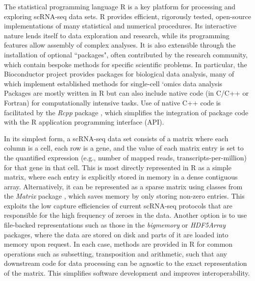 \documentclass[10pt,letterpaper]{article}
\begin{document}
The statistical programming language R \cite{R} is a key platform for processing and exploring scRNA-seq data sets.
R provides efficient, rigorously tested, open-source implementations of many statistical and numerical procedures.
Its interactive nature lends itself to data exploration and research, while its programming features allow assembly of complex analyses.
It is also extensible through the installation of optional ``packages", often contributed by the research community, which contain bespoke methods for specific scientific problems.
In particular, the Bioconductor project \cite{gentleman2004bioconductor,huber2015orchestrating} provides packages for biological data analysis, many of which implement established methods for single-cell `omics data analysis \cite{trapnell2014dynamics,lun2016pooling,mccarthy2017scater,finak2015mast}
Packages are mostly written in R but can also include native code (in C/C++ or Fortran) for computationally intensive tasks.
Use of native C++ code is facilitated by the \textit{Rcpp} package \cite{eddelbuettel2011seamless}, which simplifies the integration of package code with the R application programming interface (API).

In its simplest form, a scRNA-seq data set consists of a matrix where each column is a cell, each row is a gene, and the value of each matrix entry is set to the quantified expression (e.g., number of mapped reads, transcripts-per-million) for that gene in that cell.
This is most directly represented in R as a simple matrix, where each entry is explicitly stored in memory in a dense contiguous array.
Alternatively, it can be represented as a sparse matrix using classes from the \textit{Matrix} package \cite{bates2017matrix}, which saves memory by only storing non-zero entries.
This exploits the low capture efficiencies of current scRNA-seq protocols \cite{grun2015design} that are responsible for the high frequency of zeroes in the data.
Another option is to use file-backed representations such as those in the \textit{bigmemory} \cite{kane2013scalable} or \textit{HDF5Array} packages, where the data are stored on disk and parts of it are loaded into memory upon request.
In each case, methods are provided in R for common operations such as subsetting, transposition and arithmetic, such that any downstream code for data processing can be agnostic to the exact representation of the matrix.
This simplifies software development and improves interoperability.
\end{document}
